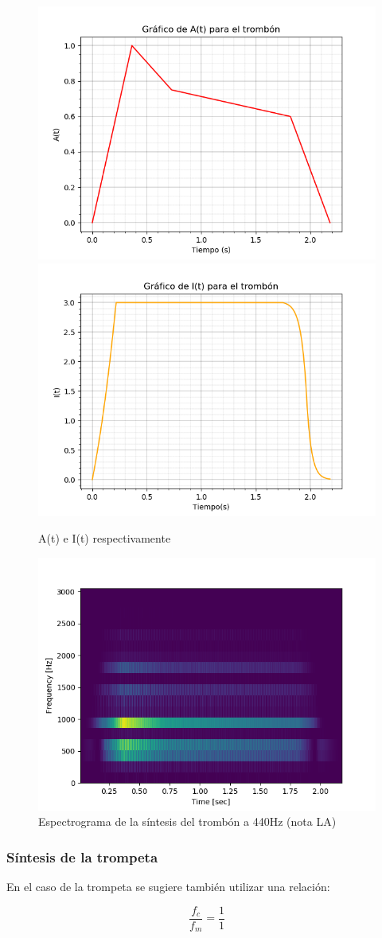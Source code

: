 \documentclass[assd_tp2_main.tex]{subfiles}
\begin{document}
{\begin{figure}[H]
\centering
\includegraphics[width=0.4\linewidth]{graficos/EJ4/at_trombon.png}
\includegraphics[width=0.4\linewidth]{graficos/EJ4/it_trombon.png}
\caption{A(t) e I(t) respectivamente}
\label{fig:trombone_envelopes}
\end{figure}

\begin{figure}[H]
\centering
\includegraphics[width=0.4\linewidth]{graficos/EJ4/espectrograma_trombon.png}
\caption{Espectrograma de la síntesis del trombón a 440Hz (nota LA)}
\label{fig:trombone_440}
\end{figure}

\newpage

\subsubsection{S\'intesis de la trompeta}

En el caso de la trompeta se sugiere tambi\'en utilizar una relaci\'on:

\[
\frac{f_c}{f_m} = \frac{1}{1}
\]

}
\end{document}
